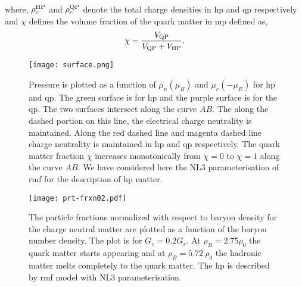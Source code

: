 \documentclass[a4paper, 11pt]{article}
\begin{document}
\noindent where, $\rho_c^{\rm HP}$ and $\rho_c^{\rm QP}$ denote the total charge densities in \ac{hp} and \ac{qp} respectively and $\chi$ defines the volume fraction of the quark matter in \ac{mp} defined as,
\begin{eqnarray}
\chi=\frac{V_{\rm QP}}{V_{\rm QP}+V_{\rm HP}}. \label{chi}
\end{eqnarray}

\begin{figure}
\centering
\texttt{[image: surface.png]}
\caption{Pressure is plotted as a function of $\mu_n(\mu_B)$ and $\mu_e(-\mu_E)$ for \ac{hp} and \ac{qp}. The green surface is for \ac{hp} and the purple surface is for the \ac{qp}. The two surfaces intersect along the curve $AB$. The along the dashed portion on this line, the electrical charge neutrality is maintained. Along the red dashed line and magenta dashed line charge neutrality is maintained in \ac{hp} and \ac{qp} respectively. The quark matter fraction $\chi$ increases monotonically from $\chi=0$ to $\chi=1$ along the curve $AB$. We have considered here the NL3 parameterisation of \ac{rmf} for the description of \ac{hp} matter.}
\label{figure:surface}
\end{figure}



\begin{figure}
\centering
\texttt{[image: prt-frxn02.pdf]}
\caption{The particle fractions normalized with respect to baryon density for the charge neutral matter are plotted as a function of the baryon number density. The plot is for $G_v=0.2G_s$. At $\rho_B=2.75 \rho_0$ the quark matter starts appearing and at $\rho_B=5.72~\rho_0$ the hadronic matter melts completely to the quark matter. The \ac{hp} is described by \ac{rmf} model with NL3 parameterisation.}
\label{figure:prt-frxn02}
\end{figure}
\end{document}
